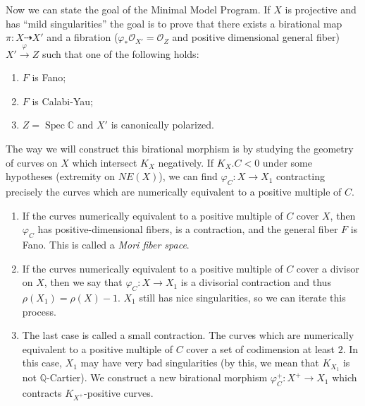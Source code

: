 \documentclass[leqno, openany]{memoir}
\theoremstyle{definition}
\theoremstyle{remark}
\theoremstyle{plain}
\theoremstyle{definition}
\theoremstyle{remark}
\newcommand{\C}{\mathbb{C}}
\newcommand{\Q}{\mathbb{Q}}
\newcommand{\msc}[1]{\mathscr{#1}}
\DeclareMathOperator{\Spec}{Spec}
\begin{document}
Now we can state the goal of the Minimal Model Program. If $X$ is projective and has ``mild singularities'' the goal is to prove that there exists a birational map $\pi \colon X \dashrightarrow X'$ and a fibration ($\varphi_* \msc{O}_{X'} = \msc{O}_Z$ and positive dimensional general fiber) $X' \xrightarrow{\varphi} Z$ such that one of the following holds:
\begin{enumerate}
    \item $F$ is Fano;
    \item $F$ is Calabi-Yau;
    \item $Z = \Spec \C$ and $X'$ is canonically polarized.
\end{enumerate}
The way we will construct this birational morphism is by studying the geometry of curves on $X$ which intersect $K_X$ negatively. If $K_X.C < 0$ under some hypotheses (extremity on $NE(X)$), we can find $\varphi_C \colon X \to X_1$ contracting precisely the curves which are numerically equivalent to a positive multiple of $C$.

\begin{enumerate}
    \item If the curves numerically equivalent to a positive multiple of $C$ cover $X$, then $\varphi_C$ has positive-dimensional fibers, is a contraction, and the general fiber $F$ is Fano. This is called a \textit{Mori fiber space}.
    \item If the curves numerically equivalent to a positive multiple of $C$ cover a divisor on $X$, then we say that $\varphi_C \colon X \to X_1$ is a divisorial contraction and thus $\rho(X_1) = \rho(X) - 1$. $X_1$ still has nice singularities, so we can iterate this process.
    \item The last case is called a small contraction. The curves which are numerically equivalent to a positive multiple of $C$ cover a set of codimension at least $2$. In this case, $X_1$ may have very bad singularities (by this, we mean that $K_{X_1}$ is not $\Q$-Cartier). We construct a new birational morphism $\varphi_C^+ \colon X^+ \to X_1$ which contracts $K_{X^+}$-positive curves.
\end{enumerate}
\end{document}
